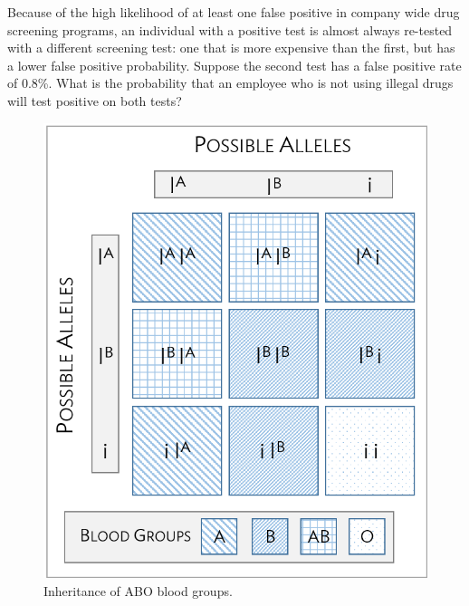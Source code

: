 \begin{exercisewrap}
\begin{nexercise}
Because of the high likelihood of at least one false positive in company wide drug screening programs, an individual with a positive test is almost always re-tested with a different screening test: one that is more expensive than the first, but has a lower false positive probability. Suppose the second test has a false positive rate of 0.8\%.  What is the probability that an employee who is not using illegal drugs will test positive on both tests?\footnotemark{}
\end{nexercise}
\end{exercisewrap}

\textD{\newpage}

\begin{figure}[h]
	\centering
	\includegraphics[height=0.5\textwidth]{ch_probability_oi_biostat/figures/aboInheritance/aboInheritance.png}
	\caption{Inheritance of ABO blood groups.}
	\label{fig:aboInheritance}
\end{figure}

